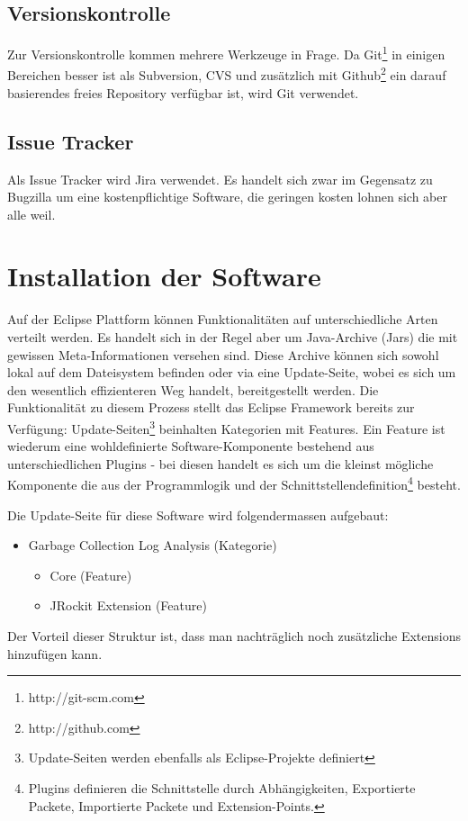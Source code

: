 \subsection{Versionskontrolle}
Zur Versionskontrolle kommen mehrere Werkzeuge in Frage. Da Git\footnote{http://git-scm.com} in einigen Bereichen besser ist als Subversion, CVS und zusätzlich mit Github\footnote{http://github.com} ein darauf basierendes freies Repository verfügbar ist, wird Git verwendet.
\subsection{Issue Tracker}
Als Issue Tracker wird Jira verwendet. Es handelt sich zwar im Gegensatz zu Bugzilla um eine kostenpflichtige Software, die geringen kosten lohnen sich aber alle weil. 

\section{Installation der Software}\label{installation}
Auf der Eclipse Plattform können Funktionalitäten auf unterschiedliche Arten verteilt werden. Es handelt sich in der Regel aber um Java-Archive (Jars) die mit gewissen Meta-Informationen versehen sind. Diese Archive können sich sowohl lokal auf dem Dateisystem befinden oder via eine Update-Seite, wobei es sich um den wesentlich effizienteren Weg handelt, bereitgestellt werden. Die Funktionalität zu diesem Prozess stellt das Eclipse Framework bereits zur Verfügung: Update-Seiten\footnote{Update-Seiten werden ebenfalls als Eclipse-Projekte definiert} beinhalten Kategorien mit Features. Ein Feature ist wiederum eine wohldefinierte Software-Komponente bestehend aus unterschiedlichen Plugins - bei diesen handelt es sich um die kleinst mögliche Komponente die aus der Programmlogik und der Schnittstellendefinition\footnote{Plugins definieren die Schnittstelle durch Abhängigkeiten, Exportierte Packete, Importierte Packete und Extension-Points.} besteht.

Die Update-Seite für diese Software wird folgendermassen aufgebaut:
\begin{itemize}
	\item Garbage Collection Log Analysis (Kategorie)
		\begin{itemize}
			\item Core (Feature)
			\item JRockit Extension (Feature)
		\end{itemize}
\end{itemize}
Der Vorteil dieser Struktur ist, dass man nachträglich noch zusätzliche Extensions hinzufügen kann.


